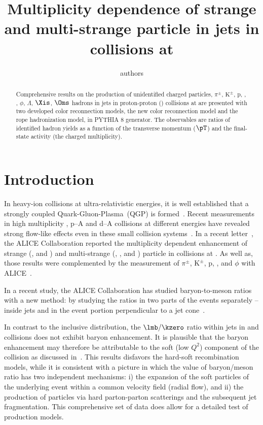 \documentclass[ALICE,manyauthors]{StrinJet}
\begin{document}
\title{Multiplicity dependence of strange and multi-strange particle in jets in \pp collisions at \seven}
\author{authors}
\begin{abstract}
	\label{sec:Abs}
Comprehensive results on the production of unidentified charged particles, $\pi^{\pm}$, $\mathrm{K^{\pm}}$, p, \kzero, \kstar, $\phi$, $\Lambda$, $\Xis$, $\Oms$ hadrons in jets in proton-proton (\pp) collisions at \seven  are presented
with two developed color reconnection models, the new color reconnection model and the rope hadronization model, in PYTHIA 8 generator. The observables are ratios of identified hadron yields as a function of the transverse momentum ($\pT$) and the final-state activity (the charged multiplicity).


\end{abstract}


\setcounter{page}{1}


\clearpage
\section{Introduction}
\label{sec:intro}
In heavy-ion collisions at ultra-relativistic energies, it is well established that a strongly coupled Quark-Gluon-Plasma~(QGP) is formed~\cite{Adams:2005dq, Adcox:2004mh, Arsene:2004fa, Back:2004je, Schukraft:2011na}.
Recent measurements in high multiplicity \pp, p--A and d--A collisions at different energies have revealed strong flow-like effects even in these small collision systems~\cite{Abelev:2012sk, Chatrchyan:2013eya, Khachatryan:2010gv, CMS:2012qk, Abelev:2012ola, Aad:2012gla, Aad:2013fja, Chatrchyan:2013nka, Adare:2013esx, Adams:2006nd}.
In a recent letter~\cite{ALICE:2016fzo}, the ALICE Collaboration reported the multiplicity dependent enhancement of strange (\kzero, \lmb and \almb) and multi-strange (\X, \Ix, \Om and \Mo) particle in \pp collisions at \seven. As well as, those results were complemented by the measurement of $\pi^{\pm}$, $\mathrm{K}^{\pm}$, p, \pbar, \kstar and $\phi$ with ALICE~\cite{ALICE:2018pal}.


In a recent study, the ALICE Collaboration has studied baryon-to-meson ratios with a new method: by studying the ratios in two parts of the events separately -- inside jets and in the event portion perpendicular to a jet cone~\cite{ALICE:2021cvd}. 

In contrast to the inclusive distribution, the $\lmb/\kzero$ ratio within jets in \pp and \pPb collisions does not exhibit baryon enhancement.
It is plausible that the baryon enhancement may therefore be attributable to the soft (low $Q^{2}$) component of the collision as discussed in~\cite{Cuautle:2014yda}.
This results disfavors the hard-soft recombination models, while it is consistent with a picture in which the value of baryon/meson ratio has two independent mechanisms: i) the expansion of the soft particles of the underlying event within  a common velocity field (radial flow), and ii) the production of particles via hard parton-parton scatterings and the subsequent jet fragmentation.
This comprehensive set of data does allow for a detailed test of production models.
\end{document}
